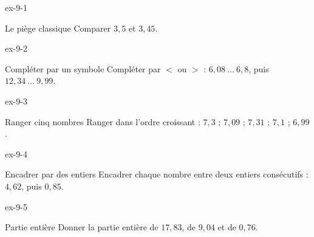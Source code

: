 \clearpage{}
\begin{blocLivre}{ex-9-1}\begin{exercice}[1]{Le piège classique}
Comparer $3{,}5$ et $3{,}45$.
\end{exercice}\end{blocLivre}
\begin{blocLivre}{ex-9-2}\begin{exercice}[1]{Compléter par un symbole}
Compléter par $<$ ou $>$ : $6{,}08\ \ldots\ 6{,}8$, puis $12{,}34\ \ldots\ 9{,}99$.
\end{exercice}\end{blocLivre}
\begin{blocLivre}{ex-9-3}\begin{exercice}[1]{Ranger cinq nombres}
Ranger dans l’ordre croissant : $7{,}3$ ; $7{,}09$ ; $7{,}31$ ; $7{,}1$ ; $6{,}99$.
\end{exercice}\end{blocLivre}
\begin{blocLivre}{ex-9-4}\begin{exercice}[1]{Encadrer par des entiers}
Encadrer chaque nombre entre deux entiers consécutifs : $4{,}62$, puis $0{,}85$.
\end{exercice}\end{blocLivre}
\begin{blocLivre}{ex-9-5}\begin{exercice}[1]{Partie entière}
Donner la partie entière de $17{,}83$, de $9{,}04$ et de $0{,}76$.
\end{exercice}\end{blocLivre}

